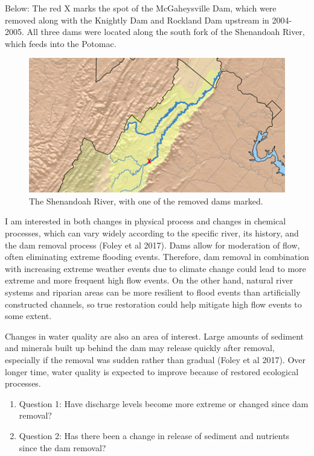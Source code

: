 \documentclass[
  12pt,
]{article}
\begin{document}
Below: The red X marks the spot of the McGaheysville Dam, which were
removed along with the Knightly Dam and Rockland Dam upstream in
2004-2005. All three dams were located along the south fork of the
Shenandoah River, which feeds into the Potomac.

\begin{figure}
\centering
\includegraphics{../Figures-and-Maps/mcgaheysvilledam.png}
\caption{The Shenandoah River, with one of the removed dams marked.}
\end{figure}

I am interested in both changes in physical process and changes in
chemical processes, which can vary widely according to the specific
river, its history, and the dam removal process (Foley et al 2017). Dams
allow for moderation of flow, often eliminating extreme flooding events.
Therefore, dam removal in combination with increasing extreme weather
events due to climate change could lead to more extreme and more
frequent high flow events. On the other hand, natural river systems and
riparian areas can be more resilient to flood events than artificially
constructed channels, so true restoration could help mitigate high flow
events to some extent.

Changes in water quality are also an area of interest. Large amounts of
sediment and minerals built up behind the dam may release quickly after
removal, especially if the removal was sudden rather than gradual (Foley
et al 2017). Over longer time, water quality is expected to improve
because of restored ecological processes.

\begin{enumerate}
\def\labelenumi{\arabic{enumi}.}
\item
  Question 1: Have discharge levels become more extreme or changed since
  dam removal?
\item
  Question 2: Has there been a change in release of sediment and
  nutrients since the dam removal?
\end{enumerate}
\end{document}
